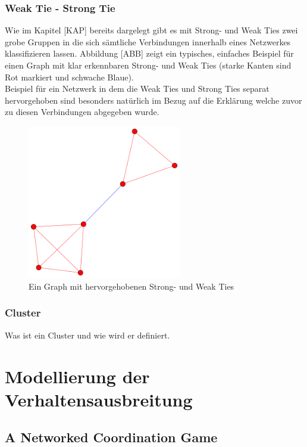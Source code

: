 \documentclass[12pt]{article}
\begin{document}
\subsubsection{Weak Tie - Strong Tie}
Wie im Kapitel [KAP] bereits dargelegt gibt es mit Strong- und Weak Ties zwei grobe Gruppen in die sich sämtliche Verbindungen innerhalb eines Netzwerkes klassifizieren lassen. Abbildung [ABB] zeigt ein typisches, einfaches Beispiel für einen Graph mit klar erkennbaren Strong- und Weak Ties (starke Kanten sind Rot markiert und schwache Blaue).\\
Beispiel für ein Netzwerk in dem die Weak Ties und Strong Ties separat hervorgehoben sind besonders natürlich im Bezug auf die Erklärung welche zuvor zu diesen Verbindungen abgegeben wurde.

\begin{figure}
  \begin{center}
    \includegraphics[width=0.60\textwidth]{pic_tieGraph.png}
  \end{center}
  \caption{Ein Graph mit hervorgehobenen Strong- und Weak Ties}
\end{figure}


\subsubsection{Cluster}
Was ist ein Cluster und wie wird er definiert.
 

\section{Modellierung der Verhaltensausbreitung}
\subsection{A Networked Coordination Game}
\end{document}
